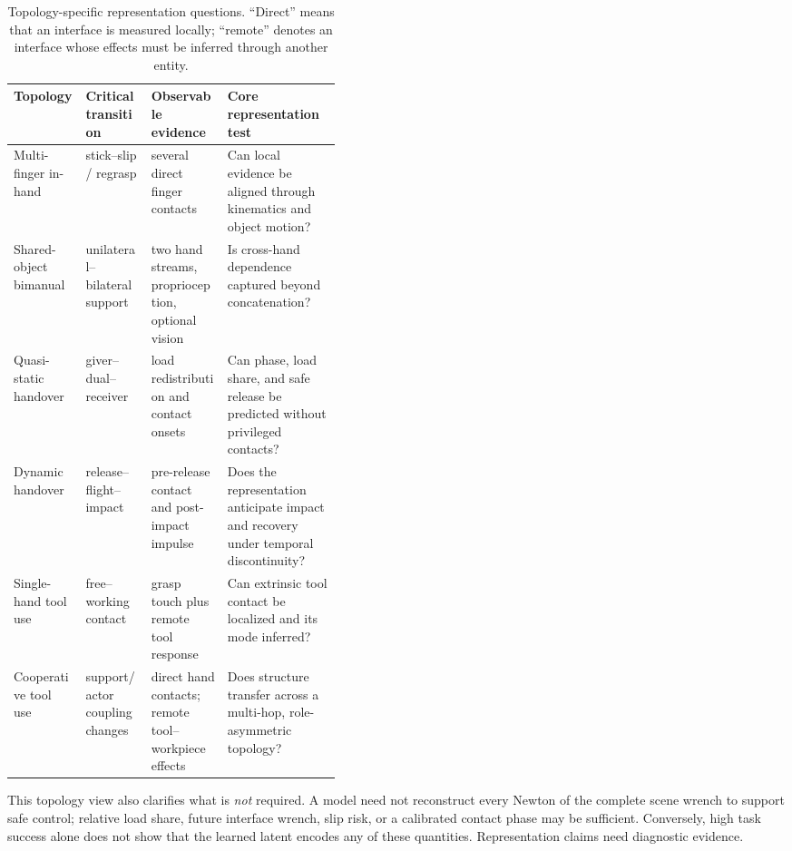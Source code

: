 \begin{table}[t]
\centering
\caption{Topology-specific representation questions. ``Direct'' means that an
interface is measured locally; ``remote'' denotes an interface whose effects must
be inferred through another entity.}
\label{tab:topology_requirements}
\begin{tabularx}{\linewidth}{P{0.22\linewidth} P{0.20\linewidth} Y Y}
\toprule
\textbf{Topology} & \textbf{Critical transition} & \textbf{Observable evidence} & \textbf{Core representation test} \\
\midrule
Multi-finger in-hand & stick--slip / regrasp & several direct finger contacts & Can local evidence be aligned through kinematics and object motion? \\
Shared-object bimanual & unilateral--bilateral support & two hand streams, proprioception, optional vision & Is cross-hand dependence captured beyond concatenation? \\
Quasi-static handover & giver--dual--receiver & load redistribution and contact onsets & Can phase, load share, and safe release be predicted without privileged contacts? \\
Dynamic handover & release--flight--impact & pre-release contact and post-impact impulse & Does the representation anticipate impact and recovery under temporal discontinuity? \\
Single-hand tool use & free--working contact & grasp touch plus remote tool response & Can extrinsic tool contact be localized and its mode inferred? \\
Cooperative tool use & support/actor coupling changes & direct hand contacts; remote tool--workpiece effects & Does structure transfer across a multi-hop, role-asymmetric topology? \\
\bottomrule
\end{tabularx}
\end{table}

This topology view also clarifies what is \emph{not} required. A model need not
reconstruct every Newton of the complete scene wrench to support safe control;
relative load share, future interface wrench, slip risk, or a calibrated contact
phase may be sufficient. Conversely, high task success alone does not show that
the learned latent encodes any of these quantities. Representation claims need
diagnostic evidence.

